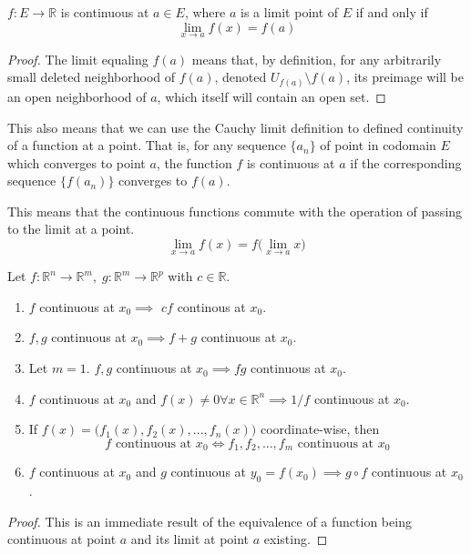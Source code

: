   \begin{lemma}
    $f: E \longrightarrow \mathbb{R}$ is continuous at $a \in E$, where $a$ is a limit point of $E$ if and only if 
    \begin{equation}
      \lim_{x \rightarrow a} f(x) = f(a)
    \end{equation}
  \end{lemma}
  \begin{proof}
    The limit equaling $f(a)$ means that, by definition, for any arbitrarily small deleted neighborhood of $f(a)$, denoted $U_{f(a)} \setminus f(a)$, its preimage will be an open neighborhood of $a$, which itself will contain an open set. 
  \end{proof}

  This also means that we can use the Cauchy limit definition to defined continuity of a function at a point. That is, for any sequence $\{a_n\}$ of point in codomain $E$ which converges to point $a$, the function $f$ is continuous at $a$ if the corresponding sequence $\{f(a_n)\}$ converges to $f(a)$.

  \begin{theorem}
    This means that the continuous functions commute with the operation of passing to the limit at a point. 
    \begin{equation}
      \lim_{x \rightarrow a} f(x) = f\Big( \lim_{x \rightarrow a} x \Big)
    \end{equation}
  \end{theorem}

  \begin{lemma}
    Let $f: \mathbb{R}^n \longrightarrow \mathbb{R}^m, \; g: \mathbb{R}^m \longrightarrow \mathbb{R}^p$ with $c \in \mathbb{R}$. 
    \begin{enumerate}
      \item $f$ continuous at $x_0 \implies$ $c f$ continous at $x_0$. 
      \item $f, g$ continuous at $x_0 \implies f + g$ continuous at $x_0$. 
      \item Let $m = 1$. $f, g$ continuous at $x_0 \implies f g$ continuous at $x_0$. 
      \item $f$ continuous at $x_0$ and $f(x) \neq 0 \forall x \in \mathbb{R}^n \implies 1 / f$ continuous at $x_0$. 
      \item If $f(x) = \big( f_1(x), f_2(x), ..., f_n(x) \big)$ coordinate-wise, then 
      \begin{equation}
        f \text{ continuous at } x_0 \iff f_1, f_2, ..., f_m \text{ continuous  at } x_0
      \end{equation}
      \item $f$ continuous at $x_0$ and $g$ continuous at $y_0 = f(x_0) \implies g \circ f$ continuous at $x_0$. 
    \end{enumerate}
  \end{lemma}
  \begin{proof}
    This is an immediate result of the equivalence of a function being continuous at point $a$ and its limit at point $a$ existing. 
  \end{proof}

